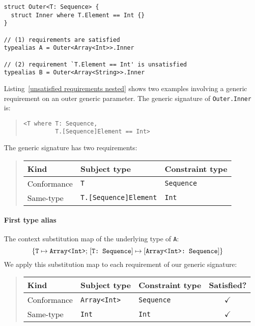 \documentclass[../generics]{subfiles}
\begin{document}
\begin{listing}\label{unsatisfied requirements nested}
\begin{Verbatim}
struct Outer<T: Sequence> {
  struct Inner where T.Element == Int {}
}

// (1) requirements are satisfied
typealias A = Outer<Array<Int>>.Inner

// (2) requirement `T.Element == Int' is unsatisfied
typealias B = Outer<Array<String>>.Inner
\end{Verbatim}
\end{listing}

\begin{example}
Listing~\ref{unsatisfied requirements nested} shows two examples involving a generic requirement on an outer generic parameter. The generic signature of \texttt{Outer.Inner} is:
\begin{quote}
\begin{verbatim}
<T where T: Sequence,
         T.[Sequence]Element == Int>
\end{verbatim}
\end{quote}
The generic signature has two requirements:
\begin{quote}
\begin{tabular}{|l|l|l|}
\hline
Kind&Subject type&Constraint type\\
\hline
Conformance&\texttt{T}&\texttt{Sequence}\\
Same-type&\texttt{T.[Sequence]Element}&\texttt{Int}\\
\hline
\end{tabular}
\end{quote}

\paragraph{First type alias} The context substitution map of the underlying type of \texttt{A}:
\[
\{\texttt{T} \mapsto \texttt{Array<Int>};\,[\texttt{T:~Sequence}] \mapsto [\texttt{Array<Int>:~Sequence}]\}
\]
We apply this substitution map to each requirement of our generic signature:
\begin{quote}
\begin{tabular}{|l|l|l|c|}
\hline
Kind&Subject type&Constraint type&Satisfied?\\
\hline
Conformance&\texttt{Array<Int>}&\texttt{Sequence}&$\checkmark$\\
Same-type&\texttt{Int}&\texttt{Int}&$\checkmark$\\
\hline
\end{tabular}
\end{quote}


\end{example}
\end{document}
